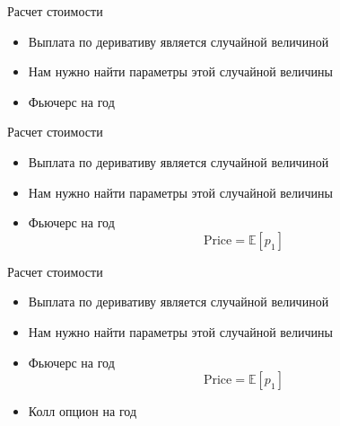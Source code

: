 \documentclass{beamer}
\newcommand{\E}{\ensuremath{\mathbb{E}}}
\begin{document}
        \begin{frame}{Расчет стоимости}
            \begin{itemize}
                \item Выплата по деривативу является случайной величиной
                \item Нам нужно найти параметры этой случайной величины
            \end{itemize}
            \begin{itemize}
                \item Фьючерс на год
            \end{itemize}
        \end{frame}

        \begin{frame}{Расчет стоимости}
            \begin{itemize}
                \item Выплата по деривативу является случайной величиной
                \item Нам нужно найти параметры этой случайной величины
            \end{itemize}
            \begin{itemize}
                \item Фьючерс на год
                \[
                    \mathrm{Price} = \E \left[ p_1 \right]
                \]
            \end{itemize}
        \end{frame}

        \begin{frame}{Расчет стоимости}
            \begin{itemize}
                \item Выплата по деривативу является случайной величиной
                \item Нам нужно найти параметры этой случайной величины
            \end{itemize}
            \begin{itemize}
                \item Фьючерс на год
                \[
                    \mathrm{Price} = \E \left[ p_1 \right]
                \]
                \item Колл опцион на год
            \end{itemize}
        \end{frame}
\end{document}

